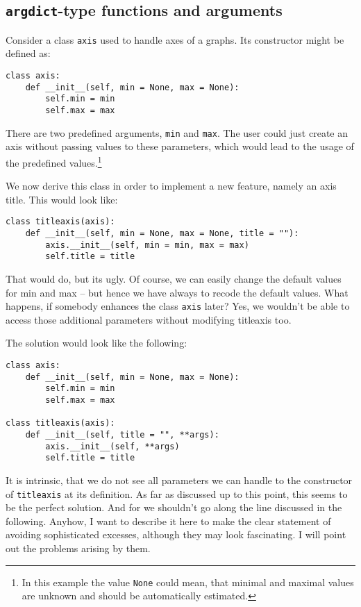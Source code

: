 \documentclass{article}
\begin{document}
\subsection*{\texttt{argdict}-type functions and arguments}

Consider a class \verb|axis| used to handle axes of a graphs. Its
constructor might be defined as:
\begin{verbatim}
class axis:
    def __init__(self, min = None, max = None):
        self.min = min
        self.max = max
\end{verbatim}

There are two predefined arguments, \verb|min| and \verb|max|. The
user could just create an axis without passing values to these
parameters, which would lead to the usage of the predefined
values.\footnote{In this example the value \texttt{None} could mean,
that minimal and maximal values are unknown and should be
automatically estimated.}

We now derive this class in order to implement a new feature, namely
an axis title. This would look like:
\begin{verbatim}
class titleaxis(axis):
    def __init__(self, min = None, max = None, title = ""):
        axis.__init__(self, min = min, max = max)
        self.title = title
\end{verbatim}

That would do, but its ugly. Of course, we can easily change the
default values for min and max -- but hence we have always to recode
the default values. What happens, if somebody enhances the class
\verb|axis| later? Yes, we wouldn't be able to access those additional
parameters without modifying titleaxis too.

The solution would look like the following:
\begin{verbatim}
class axis:
    def __init__(self, min = None, max = None):
        self.min = min
        self.max = max

class titleaxis(axis):
    def __init__(self, title = "", **args):
        axis.__init__(self, **args)
        self.title = title
\end{verbatim}

It is intrinsic, that we do not see all parameters we can handle to
the constructor of \verb|titleaxis| at its definition. As far as
discussed up to this point, this seems to be the perfect solution. And
for \PyX we shouldn't go along the line discussed in the following.
Anyhow, I want to describe it here to make the clear statement of
avoiding sophisticated excesses, although they may look fascinating.
I will point out the problems arising by them.
\end{document}
